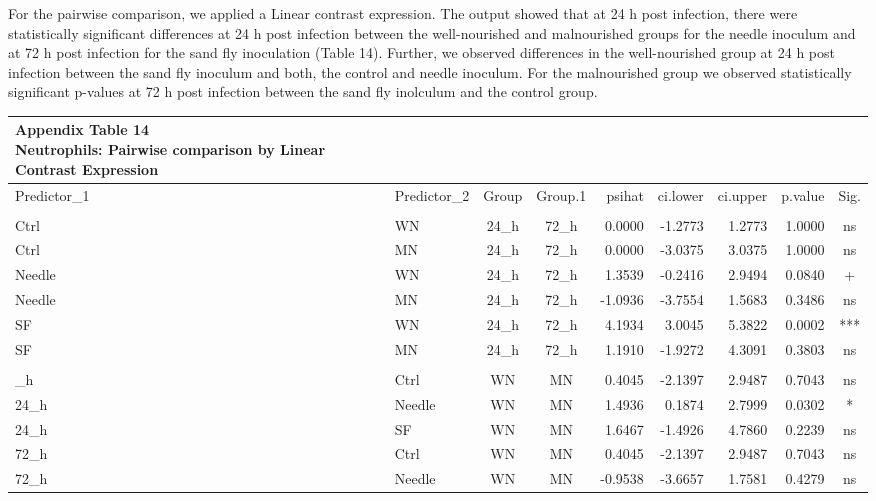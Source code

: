 \documentclass[
  12pt,
  letterpaper,
]{article}
\begin{document}
For the pairwise comparison, we applied a Linear contrast expression. The output showed that at 24 h post infection, there were statistically significant differences at 24 h post infection between the well-nourished and malnourished groups for the needle inoculum and at 72 h post infection for the sand fly inoculation (Table 14). Further, we observed differences in the well-nourished group at 24 h post infection between the sand fly inoculum and both, the control and needle inoculum. For the malnourished group we observed statistically significant p-values at 72 h post infection between the sand fly inolculum and the control group.

\begin{longtable}{llccrrrrc}
\caption*{
{\large \textbf{Appendix Table 14}} \\ 
{\small \textbf{Neutrophils: Pairwise comparison by Linear Contrast Expression}}
} \\ 
\toprule
Predictor\_1 & Predictor\_2 & Group & Group.1 & psihat & ci.lower & ci.upper & p.value & Sig. \\ 
\midrule\addlinespace[2.5pt]
\multicolumn{9}{l}{Predictor: Time\_point} \\ 
\midrule\addlinespace[2.5pt]
Ctrl & WN & 24\_h & 72\_h & 0.0000 & -1.2773 & 1.2773 & 1.0000 & ns \\ 
Ctrl & MN & 24\_h & 72\_h & 0.0000 & -3.0375 & 3.0375 & 1.0000 & ns \\ 
Needle & WN & 24\_h & 72\_h & 1.3539 & -0.2416 & 2.9494 & 0.0840 & + \\ 
Needle & MN & 24\_h & 72\_h & -1.0936 & -3.7554 & 1.5683 & 0.3486 & ns \\ 
SF & WN & 24\_h & 72\_h & 4.1934 & 3.0045 & 5.3822 & 0.0002 & *** \\ 
SF & MN & 24\_h & 72\_h & 1.1910 & -1.9272 & 4.3091 & 0.3803 & ns \\ 
\midrule\addlinespace[2.5pt]
\multicolumn{9}{l}{Predictor: Diet} \\ 
\midrule\addlinespace[2.5pt]
24\_h & Ctrl & WN & MN & 0.4045 & -2.1397 & 2.9487 & 0.7043 & ns \\ 
24\_h & Needle & WN & MN & 1.4936 & 0.1874 & 2.7999 & 0.0302 & * \\ 
24\_h & SF & WN & MN & 1.6467 & -1.4926 & 4.7860 & 0.2239 & ns \\ 
72\_h & Ctrl & WN & MN & 0.4045 & -2.1397 & 2.9487 & 0.7043 & ns \\ 
72\_h & Needle & WN & MN & -0.9538 & -3.6657 & 1.7581 & 0.4279 & ns \\ 

\end{longtable}
\end{document}
